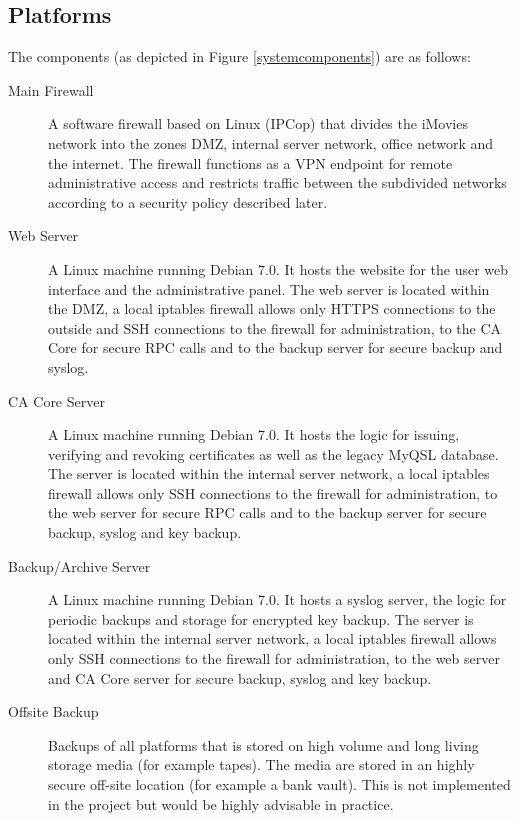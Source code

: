 \documentclass[a4paper, toc=index, 12pt, DIV14, twoside, BCOR2cm, headsepline, numbers=noenddot, bibliography=totoc]{scrbook}
\begin{document}
\subsection{Platforms}
The components (as depicted in Figure \ref{systemcomponents}) are as follows:
\begin{description}
\item[Main Firewall ] A software firewall based on Linux (IPCop) that divides the iMovies network into the zones DMZ, internal server network, office network and the internet. The firewall functions as a VPN endpoint for remote administrative access and restricts traffic between the subdivided networks according to a security policy described later.

\item[Web Server ] A Linux machine running Debian 7.0. It hosts the website for the user web interface and the administrative panel. The web server is located within the DMZ, a local iptables firewall allows only HTTPS connections to the outside and SSH connections to the firewall for administration, to the CA Core for secure RPC calls and to the backup server for secure backup and syslog.

\item[CA Core Server ] A Linux machine running Debian 7.0. It hosts the logic for issuing, verifying and revoking certificates as well as the legacy MyQSL database. The server is located within the internal server network, a local iptables firewall allows only SSH connections to the firewall for administration, to the web server for secure RPC calls and to the backup server for secure backup, syslog and key backup.

\item[Backup/Archive Server ] A Linux machine running Debian 7.0. It hosts a syslog server, the logic for periodic backups and storage for encrypted key backup. The server is located within the internal server network, a local iptables firewall allows only SSH connections to the firewall for administration, to the web server and CA Core server for secure backup, syslog and key backup.

\item[Offsite Backup ] Backups of all platforms that is stored on high volume and long living storage media (for example tapes). The media are stored in an highly secure off-site location (for example a bank vault). This is not implemented in the project but would be highly advisable in practice.
\end{description}
\end{document}
